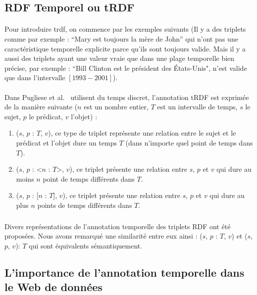 \subsection{RDF Temporel ou tRDF}
\paragraph{}
Pour introduire \gls{trdf}, on commence par les exemples suivants (Il y a des triplets comme par exemple : ``Mary est toujours la mère de John'' qui n'ont pas une caractéristique temporelle explicite parce qu’ils sont toujours valide. Mais il y a aussi des triplets ayant une valeur vraie que dans une plage temporelle bien précise, par exemple : ``Bill Clinton est le président des États-Unis", n'est valide que dans l'intervalle $[1993-2001]$).
\paragraph{}
Dans Pugliese et al.~\cite{pugliese2008} utilisent du temps discret, l’annotation tRDF est exprimée de la manière suivante ($n$ est un nombre entier, $T$ est un intervalle de temps, $s$ le sujet, $p$ le prédicat, $v$ l'objet) :
\begin{enumerate}
\item ($s$, $p$ : {$T$}, $v$), ce type de triplet représente une relation entre le sujet et le prédicat et l'objet dure un temps $T$ (dans n'importe quel point de temps dans $T$).
\item ($s$, $p$ : <$n$ : $T$>, $v$), ce triplet présente une relation entre $s$, $p$ et $v$ qui dure au moins $n$ point de temps différents dans $T$.
\item ($s$, $p$ : [$n$ : $T$], $v$), ce triplet présente une relation entre $s$, $p$ et $v$ qui dure au plus $n$ points de temps différents dans $T$.
\end{enumerate}
\subparagraph{} 
Divers représentations de l'annotation temporelle des triplets RDF ont été proposées. Nous avons remarqué une similarité entre eux ainsi : ($s$, $p$ : {$T$}, $v$) et ($s$, $p$, $v$): $T$ qui sont équivalents sémantiquement.	
\subsection{L'importance de l'annotation temporelle dans le Web de données}
